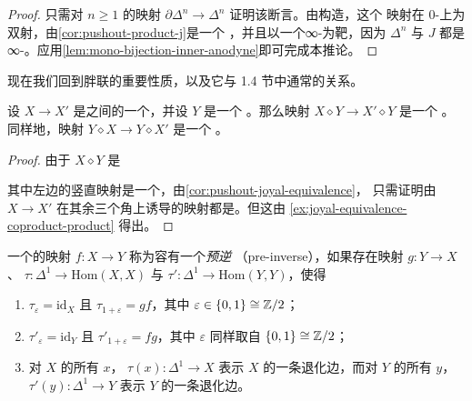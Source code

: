 \begin{proof}
只需对 $n \ge 1$ 的映射 $\partial\Delta^n \to \Delta^n$ 证明该断言。由构造，这个
映射在 $0$-\trSimplex{}上为双射，由\cref{cor:pushout-product-j}是一个%
\trJoyalEquivalence{}，并且以一个∞-\trCategory{}为靶，因为 $\Delta^n$ 与 $J$ 都是
∞-\trCategories{}。应用\cref{lem:mono-bijection-inner-anodyne}即可完成本推论。
\end{proof}

现在我们回到胖联的重要性质，以及它与 1.4 节中通常\trJoin{}的关系。

\begin{corollary}\label{cor:fat-join-joyal-equivalence}
设 $X \to X'$ 是\trSimplicialSets{}之间的一个\trJoyalEquivalence{}，并设 $Y$ 是一个%
\trSimplicialSet{}。那么映射 $X \diamond Y \to X' \diamond Y$ 是一个%
\trJoyalEquivalence{}。同样地，映射 $Y \diamond X \to Y \diamond X'$ 是一个%
\trJoyalEquivalence{}。
\end{corollary}

\begin{proof}
由于 $X \diamond Y$ 是\trPushout{}%
\begin{center}
\end{center}
其中左边的竖直映射是一个\trMonomorphism{}，由\cref{cor:pushout-joyal-equivalence}，
只需证明由 $X \to X'$ 在其余三个角上诱导的映射都是\trJoyalEquivalence{}。但这由%
\cref{ex:joyal-equivalence-coproduct-product} 得出。
\end{proof}

\begin{definition}\label{def:pre-inverse}
一个\trSimplicialSets{}的映射 $f\colon X \to Y$ 称为容有一个\emph{预逆}
（pre-inverse），如果存在映射 $g\colon Y \to X$、
$\tau\colon \Delta^1 \to \mathrm{Hom}(X, X)$ 与
$\tau'\colon \Delta^1 \to \mathrm{Hom}(Y, Y)$，使得
\begin{enumerate}[label=(\arabic*)]
  \item $\tau_\varepsilon = \mathrm{id}_X$ 且 $\tau_{1+\varepsilon} = gf$，其中
        $\varepsilon \in \{0, 1\} \cong \mathbb{Z}/2$；
  \item $\tau'_\varepsilon = \mathrm{id}_Y$ 且 $\tau'_{1+\varepsilon} = fg$，其中
        $\varepsilon$ 同样取自 $\{0, 1\} \cong \mathbb{Z}/2$；
  \item 对 $X$ 的所有\trObject{} $x$，\trMorphism{}%
        $\tau(x)\colon \Delta^1 \to X$ 表示 $X$ 的一条退化边，而对 $Y$ 的所有%
        \trObject{} $y$，$\tau'(y)\colon \Delta^1 \to Y$ 表示 $Y$ 的一条退化边。
\end{enumerate}
\end{definition}

